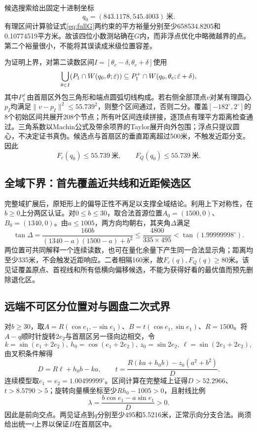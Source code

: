 \documentclass[UTF8,a4paper,zihao=-4,fontset=mac]{ctexart}
\begin{document}
候选搜索给出固定十进制坐标
\begin{equation}
q_0=(843.1178,545.4003)\ \text{米}.
\end{equation}
有理区间计算验证式\eqref{eq:fullG}两约束的平方裕量分别至少658534.8205和0.10774519平方米。故该四位小数测站确在$G$内，而非浮点优化中略微越界的点。第二个裕量很小，不能将其误读成米级位置容差。

为证明上界，对第二读数区间$I=[\theta_c-\delta,\theta_c+\delta]$使用
\begin{equation}
\bigcup_{\theta\in I}(P_1\cap W(q_0,\theta;\bar\varepsilon))
\subseteq P_1^+\cap W(q_0,\theta_c;\bar\varepsilon+\delta),
\end{equation}
其中$P_1^+$由首扇区外包三角形和端点圆弧切线构成。若右侧全部顶点$v$对某有理圆心$p_I$均满足$\|v-p_I\|^2\le55.739^2$，则整个区间通过，否则二分。覆盖$[-182^\circ,2^\circ]$的8个初始区间共展开208个节点；所有叶区间连续拼接，逐顶点有理平方距离检查通过。三角系数以Machin公式及带余项界的Taylor展开向外包围；浮点只提议圆心，不决定证书真伪。候选点与首扇区的垂直距离超过500米，不触发近距分支。因此
\begin{equation}\label{eq:q2upper}
F_c(q_0)\le55.739\ \text{米},\qquad F_Q(q_0)\le55.739\ \text{米}.
\end{equation}

\subsection{全域下界：首先覆盖近共线和近距候选区}
完整域扩展后，原矩形上的偏导正性不再足以支撑全域结论。利用上下对称性，在$b\ge0$上分两区认证。对$0\le b\le30$，取合法首源位置$A_0=(1500,0)$、$B_0=(1340,0)$。由$a\le1005$，两方向均朝右，其夹角$\Delta$满足
\begin{equation}
\tan\Delta=\frac{160b}{(1340-a)(1500-a)+b^2}
\le\frac{4800}{335\times495}<\tan(1.99999998^\circ).
\end{equation}
两位置可共同解释一个连续读数，也可在量化余量下产生同一合法显示角；距离均至少335米，不会触发近距响应。二者相隔160米，故$F_c(q),F_Q(q)\ge80$米。该见证覆盖原点、首视线和所有低横向偏移候选，不能为获得好看的最优值而预先删除退化区。

\subsection{远端不可区分位置对与圆盘二次式界}
对$b\ge30$，取$A=R(\cos e_1,-\sin e_1)$、$B=t(\cos e_1,\sin e_1)$、$R=1500$。将$A-q$顺时针旋转$2e_2$与首扇区另一径向边相交，令
\begin{equation}
k=\sin(e_1+2e_2),\ h_0=\cos(e_1+2e_2),\ z_0=\sin2e_2,\ \ell=\sin(2e_1+2e_2),
\end{equation}
由叉积条件解得
\begin{equation}
D=R\ell+h_0b-ka,\qquad
 t=\frac{R(ka+h_0b)-z_0(a^2+b^2)}{D}.
\end{equation}
连续模型取$e_1=e_2=1.00499999^\circ$。区间计算在完整域上证得$D>52.2966$、$t>8.5790>5$；旋转向量横坐标至少$Rh_0-1005>0$，且射线比例
\begin{equation}
\lambda=\frac{b\cos e_1-a\sin e_1}{D}>0.
\end{equation}
因此是前向交点。两见证点到$q$分别至少495和5.5216米，正常示向分支合法。尚须给出统一$t$上界以保证$B$在首扇区中。
\end{document}
